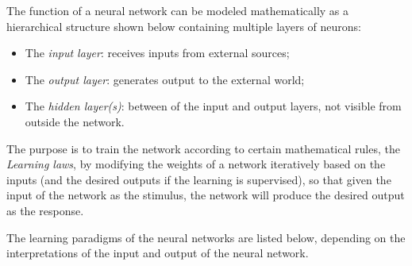 \documentclass{article}
\begin{document}
The function of a neural network can be modeled mathematically as 
a hierarchical structure shown below containing multiple layers of 
neurons:
\begin{itemize}
\item The {\em input layer}: receives inputs from external sources;
\item The {\em output layer}: generates output to the external world;
\item The {\em hidden layer(s)}: between of the input and output layers, 
  not visible from outside the network.
\end{itemize}
The purpose is to train the network according to certain mathematical
rules, the {\em Learning laws}, by modifying the weights of a network 
iteratively based on the inputs (and the desired outputs if the learning 
is supervised), so that given the input of the network as the stimulus, 
the network will produce the desired output as the response.


The learning paradigms of the neural networks are listed below, 
depending on the interpretations of the input and output of the 
neural network.
\end{document}
